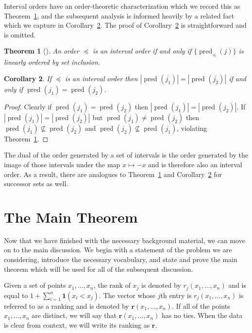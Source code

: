 \documentclass[12pt]{article}
\newcommand{\ind}[1]{\mathbf{1}(#1)}
\newcommand{\pset}[2][]{\operatorname{pred}_{#1}(#2)}
\newtheorem{theorem}{Theorem}
\numberwithin{theorem}{section}
\newtheorem{corollary}[theorem]{Corollary}
\begin{document}
Interval orders have an order-theoretic characterization which we record this as Theorem~\ref{thm_int_ord_char}, and the subsequent analysis is informed heavily by a related fact which we capture in Corollary~\ref{cor_int_ord_card}.  The proof of Corollary~\ref{cor_int_ord_card} is straightforward and is omitted.

\begin{theorem}[\cite{trotter1997intervalOrder}]
\label{thm_int_ord_char}
An order $\preceq$ is an interval order if and only if $\{\pset[\preceq]{j}\}$ is linearly ordered by set inclusion.
\end{theorem}

\begin{corollary}
\label{cor_int_ord_card}
If $\preceq$ is an interval order then $|\pset{j_1}| = |\pset{j_2}|$ if and only if $\pset{j_1} = \pset{j_2}$.
\end{corollary}
\begin{proof}
Clearly if $\pset{j_1} = \pset{j_2}$ then $|\pset{j_1}| = |\pset{j_2}|$.  If $|\pset{j_1}| = |\pset{j_2}|$ but $\pset{j_1} \neq \pset{j_2}$ then $\pset{j_1} \nsubseteq \pset{j_2}$ and $\pset{j_2} \nsubseteq \pset{j_1}$, violating Theorem~\ref{thm_int_ord_char}.
\end{proof}

\noindent
The dual of the order generated by a set of intervals is the order generated by the image of those intervals under the map $x \mapsto -x$ and is therefore also an interval order.  As a result, there are analogues to Theorem~\ref{thm_int_ord_char} and Corollary~\ref{cor_int_ord_card} for successor sets as well.


\section{The Main Theorem}
\label{sec_theory}

Now that we have finished with the necessary background material, we can move on to the main discussion.  We begin with a statement of the problem we are considering, introduce the necessary vocabulary, and state and prove the main theorem which will be used for all of the subsequent discussion.

Given a set of points $x_1, \dots, x_n$, the rank of $x_j$ is denoted by $r_j(x_1, \dots, x_n)$ and is equal to $1 + \sum_{i = 1}^n \ind{x_i < x_j}$.  The vector whose $j$th entry is $r_j(x_1, \dots, x_n)$ is referred to as a ranking and is denoted by $\mathbf{r}(x_1, \dots, x_n)$.  If all of the points $x_1, \dots, x_n$ are distinct, we will say that $\mathbf{r}(x_1, \dots, x_n)$ has no ties.  When the data is clear from context, we will write its ranking as $\mathbf{r}$.
\end{document}
